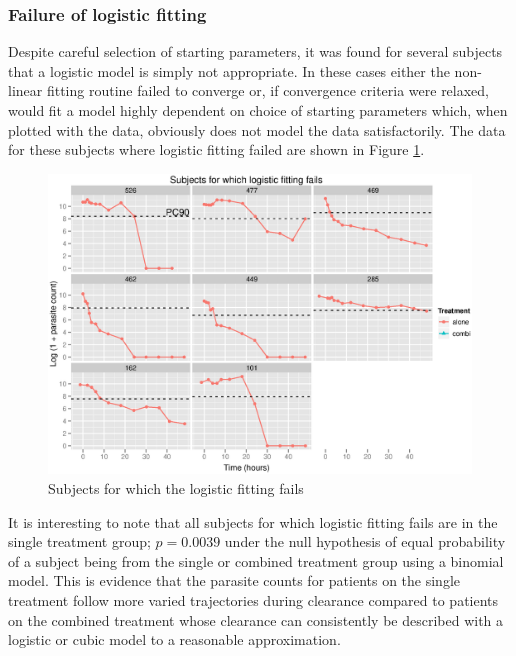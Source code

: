 \subsubsection*{Failure of logistic fitting}
Despite careful selection of starting parameters, it was found for several subjects that a logistic model is simply not appropriate. In these cases either the non-linear fitting routine failed to converge or, if convergence criteria were relaxed, would fit a model highly dependent on choice of starting parameters which, when plotted with the data, obviously does not model the data satisfactorily. The data for these subjects where logistic fitting failed are shown in Figure \ref{failures}.
\begin{figure}[h]
\includegraphics[width=150mm]{failures.eps} 
\caption{Subjects for which the logistic fitting fails}\label{failures}
\end{figure}

It is interesting to note that all subjects for which logistic fitting fails are in the single treatment group; $p=0.0039$ under the null hypothesis of equal probability of a subject being from the single or combined treatment group using a binomial model. This is evidence that the parasite counts for patients on the single treatment follow more varied trajectories during clearance compared to patients on the combined treatment whose clearance can consistently be described with a logistic or cubic model to a reasonable approximation.

